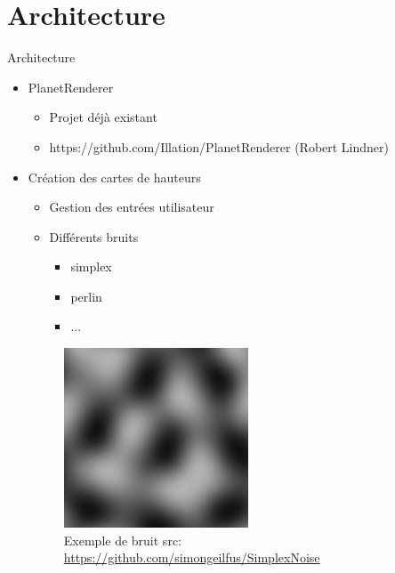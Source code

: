\section{Architecture}
\begin{frame}{Architecture}

\begin{itemize}

    \item PlanetRenderer 
        \begin{itemize}
            \item Projet déjà existant
            \item https://github.com/Illation/PlanetRenderer (Robert Lindner)\\
    \end{itemize}

    \item Création des cartes de hauteurs
    \begin{itemize}
        \item Gestion des entrées utilisateur
        \item Différents bruits
        \begin{itemize}
            \item simplex
            \item perlin
            \item ...
        \end{itemize}
    \end{itemize}

\begin{figure}
   \includegraphics[scale=0.40]{img/nosie.png}
   \caption{Exemple de bruit src: \url{https://github.com/simongeilfus/SimplexNoise}}
\end{figure}

    
\end{itemize}

\end{frame}


